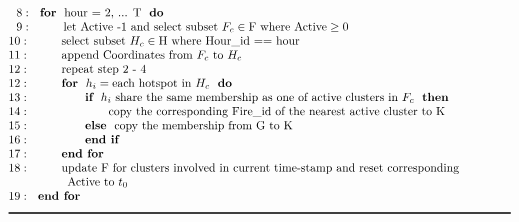 \documentclass[11pt,a4paper,]{article}
\begin{document}
\begin{table}
\begin{align*}
&~~8:~~\textbf{for}~~\text{hour = 2, ... T}~~\textbf{do} \\[-1\jot]
&~~9:~~~~~~~~\text{let Active -1 and select subset }F_c \in \text{F where Active} \geq 0\\[-1\jot]
&10:~~~~~~~~\text{select subset }H_c \in \text{H where Hour\textunderscore id == hour}\\[-1\jot]
&11:~~~~~~~~\text{append Coordinates from }F_c~\text{to}~H_c\\[-1\jot]
&12:~~~~~~~~\text{repeat step 2 - 4}\\[-1\jot]
&12:~~~~~~~~\textbf{for}~~h_i = \text{each hotspot in }H_c~~\textbf{do}\\[-1\jot]
&13:~~~~~~~~~~~~~~\textbf{if}~~h_i~\text{share the same membership as one of active clusters in }F_c~~\textbf{then}\\[-1\jot]
&14:~~~~~~~~~~~~~~~~~~~~\text{copy the corresponding Fire\textunderscore id of the nearest active cluster to K}\\[-1\jot]
&15:~~~~~~~~~~~~~~\textbf{else}~~\text{copy the membership from G to K}\\[-1\jot]
&16:~~~~~~~~~~~~~~\textbf{end if}\\[-1\jot]
&17:~~~~~~~~\textbf{end for}\\[-1\jot]
&18:~~~~~~~~\text{update F for clusters involved in current time-stamp and reset corresponding}\\[-1\jot]
&~~~~~~~~~~~~~~~\text{Active to }t_0\\[-1\jot]
&19:~~\textbf{end for}\\[-1\jot]
&\rule{150mm}{0.5mm}
\end{align*}
\end{table}
\end{document}
